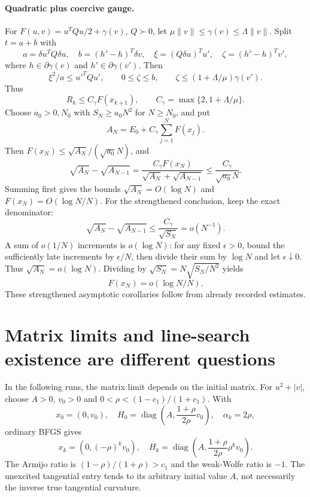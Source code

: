 \paragraph{Quadratic plus coercive gauge.}
For $F(u,v)=u^TQu/2+\gamma(v)$, $Q\succ0$, let $\mu\|v\|\le\gamma(v)\le\Lambda\|v\|$. Split $t=a+b$ with
\[
 a=\delta u^TQ\delta u,\quad b=(h'-h)^T\delta v,\quad
 \xi=(Q\delta u)^Tu',\quad\zeta=(h'-h)^Tv',
\]
where $h\in\partial\gamma(v)$ and $h'\in\partial\gamma(v')$. Then
\[
 \xi^2/a\le u'^TQu',\qquad0\le\zeta\le b,
 \qquad\zeta\le(1+\Lambda/\mu)\gamma(v').
\]
Thus
\[
 R_k\le C_\gamma F(x_{k+1}),\qquad
 C_\gamma=\max\{2,1+\Lambda/\mu\}.
\]
Choose $a_0>0,N_0$ with $S_N\ge a_0N^2$ for $N\ge N_0$, and put
\[
 A_N=E_0+C_\gamma\sum_{j=1}^NF(x_j).
\]
Then $F(x_N)\le\sqrt{A_N}/(\sqrt{a_0}N)$, and
\[
 \sqrt{A_N}-\sqrt{A_{N-1}}
 =\frac{C_\gamma F(x_N)}{\sqrt{A_N}+\sqrt{A_{N-1}}}
 \le\frac{C_\gamma}{\sqrt{a_0}N}.
\]
Summing first gives the bounds $\sqrt{A_N}=O(\log N)$ and $F(x_N)=O(\log N/N)$. For the strengthened conclusion, keep the exact denominator:
\[
 \sqrt{A_N}-\sqrt{A_{N-1}}\le \frac{C_\gamma}{\sqrt{S_N}}=o(N^{-1}).
\]
A sum of $o(1/N)$ increments is $o(\log N)$: for any fixed $\epsilon>0$, bound the sufficiently late increments by $\epsilon/N$, then divide their sum by $\log N$ and let $\epsilon\downarrow0$. Thus $\sqrt{A_N}=o(\log N)$. Dividing by $\sqrt{S_N}=N\sqrt{S_N/N^2}$ yields
\[
 \boxed{F(x_N)=o(\log N/N).}
\]
These strengthened asymptotic corollaries follow from already recorded estimates.



\section{Matrix limits and line-search existence are different questions}

In the following runs, the matrix limit depends on the initial matrix. For $u^2+|v|$, choose $A>0$, $v_0>0$ and $0<\rho<(1-c_1)/(1+c_1)$. With
\[
 x_0=(0,v_0),\quad
 H_0=\operatorname{diag}\left(A,\frac{1+\rho}{2\rho}v_0\right),\quad\alpha_k=2\rho,
\]
ordinary BFGS gives
\[
 x_k=(0,(-\rho)^kv_0),\quad
 H_k=\operatorname{diag}\left(A,\frac{1+\rho}{2\rho}\rho^kv_0\right).
\]
The Armijo ratio is $(1-\rho)/(1+\rho)>c_1$ and the weak-Wolfe ratio is $-1$. The unexcited tangential entry tends to its arbitrary initial value $A$, not necessarily the inverse true tangential curvature.

